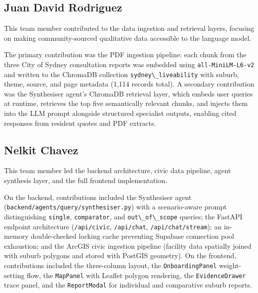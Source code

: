 \documentclass[11pt,a4paper]{article}
\newcommand{\passthrough}[1]{#1}
\begin{document}
\subsection{Juan David Rodriguez}\label{juan-david-rodriguez}

This team member contributed to the data ingestion and retrieval layers, focusing on making community-sourced qualitative data accessible to the language model.

The primary contribution was the PDF ingestion pipeline: each chunk from the three City of Sydney consultation reports was embedded using \passthrough{\lstinline!all-MiniLM-L6-v2!} and written to the ChromaDB collection \passthrough{\lstinline!sydney\_liveability!} with suburb, theme, source, and page metadata (1,114 records total). A secondary contribution was the Synthesiser agent's ChromaDB retrieval layer, which embeds user queries at runtime, retrieves the top five semantically relevant chunks, and injects them into the LLM prompt alongside structured specialist outputs, enabling cited responses from resident quotes and PDF extracts.

\subsection{Nelkit Chavez}\label{nelkit-chavez}

This team member led the backend architecture, civic data pipeline, agent synthesis layer, and the full frontend implementation.

On the backend, contributions included the Synthesiser agent (\passthrough{\lstinline!backend/agents/query/synthesiser.py!}) with a scenario-aware prompt distinguishing \passthrough{\lstinline!single!}, \passthrough{\lstinline!comparator!}, and \passthrough{\lstinline!out\_of\_scope!} queries; the FastAPI endpoint architecture (\passthrough{\lstinline!/api/civic!}, \passthrough{\lstinline!/api/chat!}, \passthrough{\lstinline!/api/chat/stream!}); an in-memory double-checked locking cache preventing Supabase connection pool exhaustion; and the ArcGIS civic ingestion pipeline (facility data spatially joined with suburb polygons and stored with PostGIS geometry). On the frontend, contributions included the three-column layout, the \passthrough{\lstinline!OnboardingPanel!} weight-setting flow, the \passthrough{\lstinline!MapPanel!} with Leaflet polygon rendering, the \passthrough{\lstinline!EvidenceDrawer!} trace panel, and the \passthrough{\lstinline!ReportModal!} for individual and comparative suburb reports.
\end{document}
